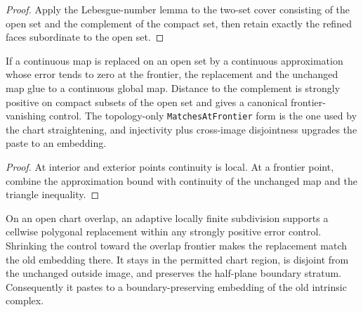 \begin{proof}
\leanok
Apply the Lebesgue-number lemma to the two-set cover consisting of the open set
and the complement of the compact set, then retain exactly the refined faces
subordinate to the open set.
\end{proof}

\begin{lemma}
\label{moise:lem:frontier_glue}
\leanok
If a continuous map is replaced on an open set by a continuous approximation
whose error tends to zero at the frontier, the replacement and the unchanged
map glue to a continuous global map.  Distance to the complement is strongly
positive on compact subsets of the open set and gives a canonical
frontier-vanishing control.  The topology-only
\texttt{MatchesAtFrontier} form is the one used by the chart straightening,
and injectivity plus cross-image disjointness upgrades the paste to an
embedding.
\end{lemma}

\begin{proof}
\leanok
At interior and exterior points continuity is local.  At a frontier point,
combine the approximation bound with continuity of the unchanged map and the
triangle inequality.
\end{proof}

\begin{theorem}
\label{moise:thm:controlled_chart_straightening}
\leanok
{}
On an open chart overlap, an adaptive locally finite subdivision supports a
cellwise polygonal replacement within any strongly positive error control.
Shrinking the control toward the overlap frontier makes the replacement match
the old embedding there.  It stays in the permitted chart region, is disjoint
from the unchanged outside image, and preserves the half-plane boundary
stratum.  Consequently it pastes to a boundary-preserving embedding of the old
intrinsic complex.
\end{theorem}

